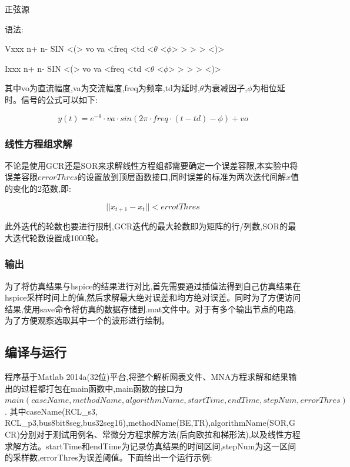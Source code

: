 \documentclass[12pt]{article}
\begin{document}
\begin{sloppypar}
\qquad 正弦源

\qquad 语法:

\qquad Vxxx n+ n- SIN <(> vo va <freq <td <$\theta$ <$\phi$> > > > <)>

\qquad Ixxx n+ n- SIN <(> vo va <freq <td <$\theta$ <$\phi$> > > > <)>

\qquad 其中vo为直流幅度,va为交流幅度,freq为频率,td为延时,$\theta$为衰减因子,$\phi$为相位延时。信号的公式可以如下:

\begin{equation}
  y(t) = e^{-\theta}\cdot va \cdot sin(2\pi \cdot freq \cdot(t-td) - \phi) + vo
\end{equation}


\subsubsection{线性方程组求解}
\qquad 不论是使用GCR还是SOR来求解线性方程组都需要确定一个误差容限,本实验中将误差容限$errorThres$的设置放到顶层函数接口,同时误差的标准为两次迭代间解$x$值的变化的2范数,即:

\begin{equation}
  ||x_{t+1} - x_{t}|| < errotThres
\end{equation}

\qquad 此外迭代的轮数也要进行限制,GCR迭代的最大轮数即为矩阵的行/列数,SOR的最大迭代轮数设置成1000轮。

\subsubsection{输出}
\qquad 为了将仿真结果与hspice的结果进行对比,首先需要通过插值法得到自己仿真结果在hspice采样时间上的值,然后求解最大绝对误差和均方绝对误差。同时为了方便访问结果,使用save命令将仿真的数据存储到.mat文件中。对于有多个输出节点的电路,为了方便观察选取其中一个的波形进行绘制。

\subsection{编译与运行}
\qquad 程序基于Matlab 2014a(32位)平台,将整个解析网表文件、MNA方程求解和结果输出的过程都打包在main函数中,main函数的接口为$main(caseName, methodName,algorithmName, startTime, endTime, stepNum, errorThres)$. 其中caseName(RCL\_s3, RCL\_p3,bus8bit8seg,bus32seg16),methodName(BE,TR),algorithmName(SOR,GCR)分别对于测试用例名、常微分方程求解方法(后向欧拉和梯形法),以及线性方程求解方法。startTime和endTime为记录仿真结果的时间区间,stepNum为这一区间的采样数,errorThres为误差阈值。下面给出一个运行示例:


\end{sloppypar}
\end{document}
